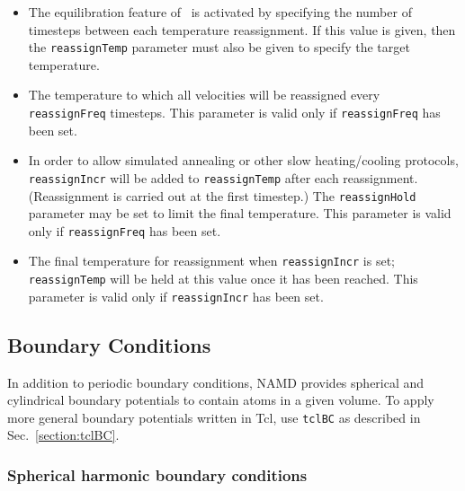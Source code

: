 \begin{itemize}

\item
{}
{The equilibration feature of \NAMD\ is activated by 
specifying the number of timesteps between each temperature reassignment.
If this value is given, then the {\tt reassignTemp} parameter must also 
be given to specify the target temperature. }

\item
{}
{The temperature to which all velocities will be reassigned
every {\tt reassignFreq} timesteps.  
This parameter is valid only if {\tt reassignFreq} has been set.}

\item
{}
{In order to allow simulated annealing or other slow heating/cooling protocols, {\tt reassignIncr} will be added to {\tt reassignTemp} after each reassignment.
(Reassignment is carried out at the first timestep.)  The {\tt reassignHold} parameter may be set to limit the final temperature.
This parameter is valid only if {\tt reassignFreq} has been set.}

\item
{}
{The final temperature for reassignment when {\tt reassignIncr} is set; {\tt reassignTemp} will be held at this value once it has been reached.
This parameter is valid only if {\tt reassignIncr} has been set.}

\end{itemize}

\subsection{Boundary Conditions}

In addition to periodic boundary conditions, NAMD provides spherical and
cylindrical boundary potentials to contain atoms in a given volume.
To apply more general boundary potentials written in Tcl, use
{\tt tclBC} as described in Sec.~\ref{section:tclBC}.

\subsubsection{Spherical harmonic boundary conditions}

